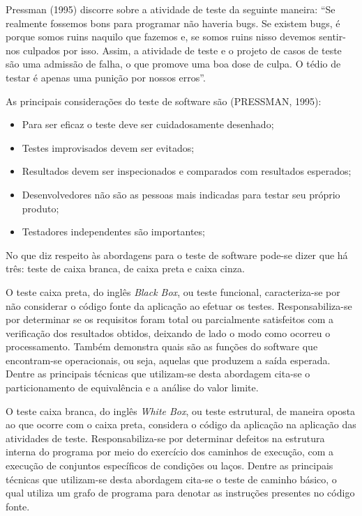 Pressman (1995) discorre sobre a atividade de teste da seguinte maneira: “Se realmente fossemos bons para programar não haveria bugs. Se existem bugs, é porque somos ruins naquilo que fazemos e, se somos ruins nisso devemos sentir-nos culpados por isso. Assim, a atividade de teste e o projeto de casos de teste são 
uma admissão de falha, o que promove uma boa dose de culpa. O tédio de testar é apenas uma punição por nossos erros”. 

As principais considerações do teste de software são (PRESSMAN, 1995): 

\begin{itemize}
\item Para ser eficaz o teste deve ser cuidadosamente desenhado;
\item Testes improvisados devem ser evitados;
\item Resultados devem ser inspecionados e comparados com resultados esperados;
\item Desenvolvedores não são as pessoas mais indicadas para testar seu próprio produto;
\item Testadores independentes são importantes;
\end{itemize}

No que diz respeito às abordagens para o teste de software pode-se dizer que há três: teste de caixa branca, de caixa preta e caixa cinza.

O teste caixa preta, do inglês \textit{Black Box}, ou teste funcional, caracteriza-se por não considerar o código fonte da aplicação ao efetuar os testes. Responsabiliza-se por determinar se os requisitos foram total ou parcialmente satisfeitos com a verificação dos resultados obtidos, deixando de lado o modo como ocorreu o processamento. Também demonstra quais são as funções do software que encontram-se operacionais, ou seja, aquelas que produzem a saída esperada. Dentre as principais técnicas que utilizam-se desta abordagem cita-se o particionamento de equivalência e a análise do valor limite.

O teste caixa branca, do inglês \textit{White Box}, ou teste estrutural, de maneira oposta ao que ocorre com o caixa preta, considera o código da aplicação na aplicação das atividades de teste. Responsabiliza-se por determinar defeitos na estrutura interna do programa por meio do exercício dos caminhos de execução, com a execução de conjuntos específicos de condições ou laços. Dentre as principais técnicas
 que utilizam-se desta abordagem cita-se o teste de caminho básico, o qual utiliza um grafo de programa para denotar as instruções presentes no código fonte.

